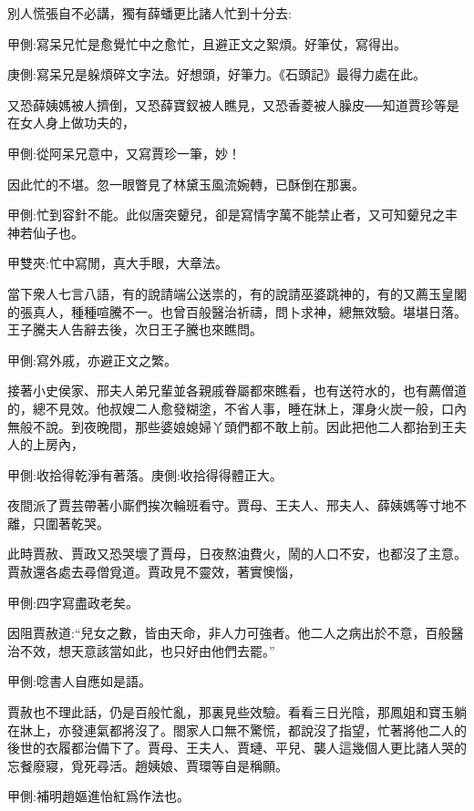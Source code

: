 \begin{parag}
    別人慌張自不必講，獨有薛蟠更比諸人忙到十分去:\begin{note}甲側:寫呆兄忙是愈覺忙中之愈忙，且避正文之絮煩。好筆仗，寫得出。\end{note}\begin{note}庚側:寫呆兄是躲煩碎文字法。好想頭，好筆力。《石頭記》最得力處在此。\end{note}又恐薛姨媽被人擠倒，又恐薛寶釵被人瞧見，又恐香菱被人臊皮──知道賈珍等是在女人身上做功夫的，\begin{note}甲側:從阿呆兄意中，又寫賈珍一筆，妙！\end{note}因此忙的不堪。忽一眼瞥見了林黛玉風流婉轉，已酥倒在那裏。\begin{note}甲側:忙到容針不能。此似唐突顰兒，卻是寫情字萬不能禁止者，又可知顰兒之丰神若仙子也。\end{note}\begin{note}甲雙夾:忙中寫閒，真大手眼，大章法。\end{note}
\end{parag}


\begin{parag}
    當下衆人七言八語，有的說請端公送祟的，有的說請巫婆跳神的，有的又薦玉皇閣的張真人，種種喧騰不一。也曾百般醫治祈禱，問卜求神，總無效驗。堪堪日落。王子騰夫人告辭去後，次日王子騰也來瞧問。\begin{note}甲側:寫外戚，亦避正文之繁。\end{note}接著小史侯家、邢夫人弟兄輩並各親戚眷屬都來瞧看，也有送符水的，也有薦僧道的，總不見效。他叔嫂二人愈發糊塗，不省人事，睡在牀上，渾身火炭一般，口內無般不說。到夜晚間，那些婆娘媳婦丫頭們都不敢上前。因此把他二人都抬到王夫人的上房內，\begin{note}甲側:收拾得乾淨有著落。庚側:收拾得得體正大。\end{note}夜間派了賈芸帶著小廝們挨次輪班看守。賈母、王夫人、邢夫人、薛姨媽等寸地不離，只圍著乾哭。
\end{parag}


\begin{parag}
    此時賈赦、賈政又恐哭壞了賈母，日夜熬油費火，鬧的人口不安，也都沒了主意。賈赦還各處去尋僧覓道。賈政見不靈效，著實懊惱，\begin{note}甲側:四字寫盡政老矣。\end{note}因阻賈赦道:“兒女之數，皆由天命，非人力可強者。他二人之病出於不意，百般醫治不效，想天意該當如此，也只好由他們去罷。”\begin{note}甲側:唸書人自應如是語。\end{note}賈赦也不理此話，仍是百般忙亂，那裏見些效驗。看看三日光陰，那鳳姐和寶玉躺在牀上，亦發連氣都將沒了。閤家人口無不驚慌，都說沒了指望，忙著將他二人的後世的衣履都治備下了。賈母、王夫人、賈璉、平兒、襲人這幾個人更比諸人哭的忘餐廢寢，覓死尋活。趙姨娘、賈環等自是稱願。\begin{note}甲側:補明趙嫗進怡紅爲作法也。\end{note}
\end{parag}


